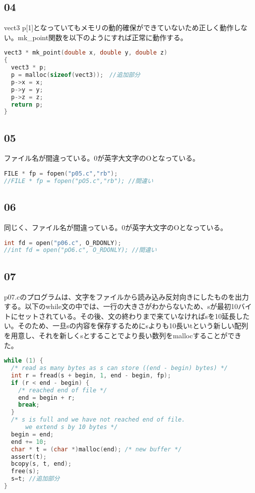 \documentclass{ltjsarticle}
\begin{document}
\subsection{04}
vect3 p[1]となっていてもメモリの動的確保ができていないため正しく動作しない。mk\_point関数を以下のようにすれば正常に動作する。
\begin{lstlisting}[caption=p04.c 変更部分,language=C]
vect3 * mk_point(double x, double y, double z)
{
  vect3 * p;
  p = malloc(sizeof(vect3));　//追加部分
  p->x = x;
  p->y = y;
  p->z = z;
  return p;
}
\end{lstlisting}
\subsection{05}
ファイル名が間違っている。0が英字大文字のOとなっている。
\begin{lstlisting}[caption=p05.c 変更部分,language=C]
FILE * fp = fopen("p05.c","rb");
//FILE * fp = fopen("pO5.c","rb"); //間違い
\end{lstlisting}
\subsection{06}
同じく、ファイル名が間違っている。0が英字大文字のOとなっている。
\begin{lstlisting}[caption=p06.c 変更部分,language=C]
int fd = open("p06.c", O_RDONLY);
//int fd = open("pO6.c", O_RDONLY); //間違い
\end{lstlisting}
\subsection{07}
p07.cのプログラムは、文字をファイルから読み込み反対向きにしたものを出力する。以下のwhile文の中では、一行の大きさがわからないため、sが最初10バイトにセットされている。その後、文の終わりまで来ていなければsを10延長したい。そのため、一旦sの内容を保存するためにsよりも10長いtという新しい配列を用意し、それを新しくsとすることでより長い数列をmallocすることができた。
\begin{lstlisting}[caption=p07.c 変更部分,language=C]
while (1) {
  /* read as many bytes as s can store ((end - begin) bytes) */
  int r = fread(s + begin, 1, end - begin, fp);
  if (r < end - begin) {
    /* reached end of file */
    end = begin + r;
    break;
  }
  /* s is full and we have not reached end of file.
      we extend s by 10 bytes */
  begin = end;
  end += 10;
  char * t = (char *)malloc(end); /* new buffer */
  assert(t);
  bcopy(s, t, end);
  free(s);
  s=t; //追加部分
}
\end{lstlisting}
\end{document}
